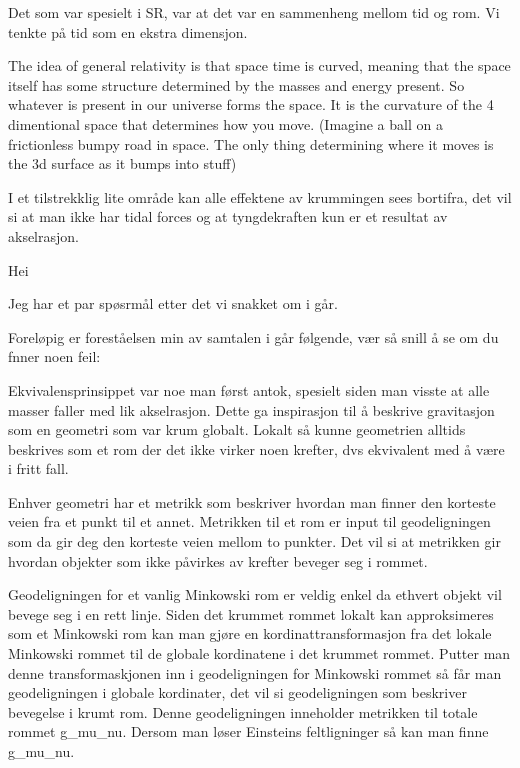 Det som var spesielt i SR, var at det var en sammenheng mellom tid og rom. Vi tenkte på tid som en ekstra dimensjon. 

The idea of general relativity is that space time is curved, meaning that the space itself has some structure determined by the masses and energy present. So whatever is present in our universe forms the space. It is the curvature of the 4 dimentional space that determines how you move. (Imagine a ball on a frictionless bumpy road in space. The only thing determining where it moves is the 3d surface as it bumps into stuff)

I et tilstrekklig lite område kan alle effektene av krummingen sees bortifra, det vil si at man ikke har tidal forces og at tyngdekraften kun er et resultat av akselrasjon. 










Hei

Jeg har et par spøsrmål etter det vi snakket om i går.

Foreløpig er foreståelsen min av samtalen i går følgende, vær så snill å se om du fnner noen feil: 

Ekvivalensprinsippet var noe man først antok, spesielt siden man visste at alle masser faller med lik akselrasjon. Dette ga inspirasjon til å beskrive gravitasjon som en geometri som var krum globalt. Lokalt så kunne geometrien alltids beskrives som et rom der det ikke virker noen krefter, dvs ekvivalent med å være i fritt fall. 

Enhver geometri har et metrikk som beskriver hvordan man finner den korteste veien fra et punkt til et annet. Metrikken til et rom er input til geodeligningen som da gir deg den korteste veien mellom to punkter. Det vil si at metrikken gir hvordan objekter som ikke påvirkes av krefter beveger seg i rommet.

Geodeligningen for et vanlig Minkowski rom er veldig enkel da ethvert objekt vil bevege seg i en rett linje.
Siden det krummet rommet lokalt kan approksimeres som et Minkowski rom kan man gjøre en kordinattransformasjon fra det lokale Minkowski rommet
til de globale kordinatene i det krummet rommet.  Putter man denne transformaskjonen inn i geodeligningen for Minkowski rommet så får man geodeligningen i globale kordinater, det vil si geodeligningen som beskriver bevegelse i krumt rom. Denne geodeligningen inneholder metrikken til totale rommet g_{mu_nu}. Dersom man løser Einsteins feltligninger så kan man finne g_{mu_nu}.

